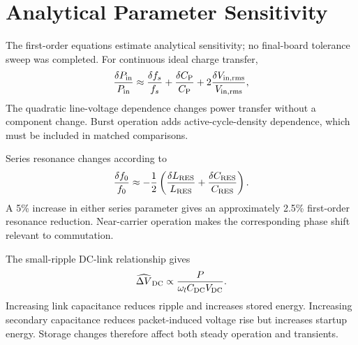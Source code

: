 \section{Analytical Parameter Sensitivity}
\label{sec:sim-sweeps}

The first-order equations estimate analytical sensitivity; no final-board tolerance sweep was completed. For continuous ideal charge transfer,
\begin{equation}
\frac{\delta P_{\mathrm{in}}}{P_{\mathrm{in}}}\approx
\frac{\delta f_s}{f_s}+\frac{\delta C_{\mathrm{P}}}{C_{\mathrm{P}}}
+2\frac{\delta V_{\mathrm{in,rms}}}{V_{\mathrm{in,rms}}},
\end{equation}
The quadratic line-voltage dependence changes power transfer without a component change. Burst operation adds active-cycle-density dependence, which must be included in matched comparisons.

Series resonance changes according to
\begin{equation}
\frac{\delta f_0}{f_0}\approx-
\frac{1}{2}\left(\frac{\delta L_{\mathrm{RES}}}{L_{\mathrm{RES}}}
+\frac{\delta C_{\mathrm{RES}}}{C_{\mathrm{RES}}}\right).
\label{eq:sim-resonance-sensitivity}
\end{equation}
A 5\% increase in either series parameter gives an approximately 2.5\% first-order resonance reduction. Near-carrier operation makes the corresponding phase shift relevant to commutation.

The small-ripple DC-link relationship gives
\begin{equation}
\widehat{\Delta V}_{\mathrm{DC}}\propto
\frac{P}{\omega_lC_{\mathrm{DC}}V_{\mathrm{DC}}}.
\end{equation}
Increasing link capacitance reduces ripple and increases stored energy. Increasing secondary capacitance reduces packet-induced voltage rise but increases startup energy. Storage changes therefore affect both steady operation and transients.

